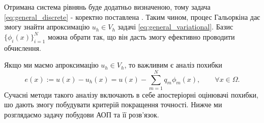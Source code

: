 Отримана система рівнянь буде додатньо визначеною, тому задача \eqref{eq:general_discrete} - коректно поставлена \cite{OstShynAee11}.
Таким чином, процес Гальоркіна дає змогу знайти апроксимацію $u_h \in V_h$ задачі \eqref{eq:general_variational}.
Базис $\lbrace \phi_i(x)\rbrace_{i=1}^N$ можна обрати так, що він дасть змогу ефективно проводити обчислення.


Якщо ми маємо апроксимацію $u_h \in V_h$, то важливим є аналіз похибки
%
\begin{equation}
	e(x) := u(x) - u_h(x) = u(x) - \sum\limits_{m=1}^N q_m \phi_m (x), \qquad \forall x \in \Omega.
\end{equation}
%
Сучасні методи такого аналізу включають в себе апостеріорні оцінювачі похибки, шо дають змогу побудувати критерій покращення точності.
Нижче ми розглядаємо задачу побудови АОП та її розв'язок.
